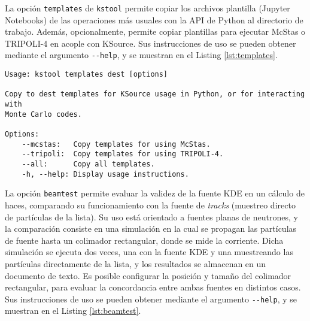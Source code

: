 La opción \verb|templates| de \verb|kstool| permite copiar los archivos plantilla (Jupyter Notebooks) de las operaciones más usuales con la API de Python al directorio de trabajo. Además, opcionalmente, permite copiar plantillas para ejecutar McStas o TRIPOLI-4 en acople con KSource. Sus instrucciones de uso se pueden obtener mediante el argumento \verb|--help|, y se muestran en el Listing \ref{lst:templates}.

\begin{lstlisting}[label={lst:templates}, caption=Instrucciones de uso del comando \texttt{kstool templates} (output de ``\texttt{kstool templates --help}'').]
Usage: kstool templates dest [options]

Copy to dest templates for KSource usage in Python, or for interacting with
Monte Carlo codes.

Options:
	--mcstas:   Copy templates for using McStas.
	--tripoli:  Copy templates for using TRIPOLI-4.
	--all:      Copy all templates.
	-h, --help: Display usage instructions.
\end{lstlisting}

La opción \verb|beamtest| permite evaluar la validez de la fuente KDE en un cálculo de haces, comparando su funcionamiento con la fuente de \emph{tracks} (muestreo directo de partículas de la lista). Su uso está orientado a fuentes planas de neutrones, y la comparación consiste en una simulación en la cual se propagan las partículas de fuente hasta un colimador rectangular, donde se mide la corriente. Dicha simulación se ejecuta dos veces, una con la fuente KDE y una muestreando las partículas directamente de la lista, y los resultados se almacenan en un documento de texto. Es posible configurar la posición y tamaño del colimador rectangular, para evaluar la concordancia entre ambas fuentes en distintos casos. Sus instrucciones de uso se pueden obtener mediante el argumento \verb|--help|, y se muestran en el Listing \ref{lst:beamtest}.

